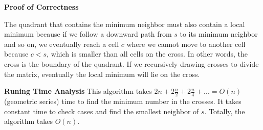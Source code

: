\documentclass[12pt,article]{article}
\begin{document}
\textbf{Proof of Correctness}

The quadrant that contains the minimum neighbor must also contain a local minimum because if we follow a downward path from $s$ to its minimum neighbor and so on, we eventually reach a cell $c$ where we cannot move to another cell because $c < s$, which is smaller than all cells on the cross. In other words, the cross is the boundary of the quadrant. If we recursively drawing crosses to divide the matrix, eventually the local minimum will lie on the cross.

\textbf{Runing Time Analysis}
This algorithm takes $2n + 2\frac{n}{2} + 2\frac{n}{4} + ... = O(n)$ (geometric series) time to find the minimum number in the crosses. It takes constant time to check cases and find the smallest neighbor of $s$. Totally, the algorithm takes $O(n)$.



\end{document}
